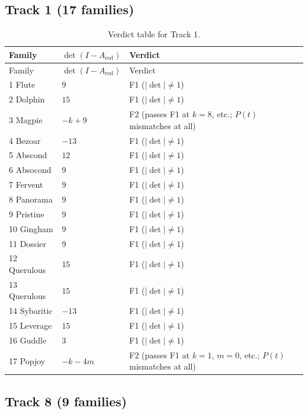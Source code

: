 \subsection{Track 1 (17 families)}

\begin{longtable}{@{}l l >{\raggedright\arraybackslash}p{}@{}}
\caption{Verdict table for Track 1.}\\
\toprule
Family & $\det(I-A_{\text{red}})$ & Verdict \\
\midrule
\endfirsthead
\toprule
Family & $\det(I-A_{\text{red}})$ & Verdict \\
\midrule
\endhead
1 Flute & $9$ & F1 ($|\det| \neq 1$) \\
2 Dolphin & $15$ & F1 ($|\det| \neq 1$) \\
3 Magpie & $-k+9$ & F2 (passes F1 at $k = 8$, etc.; $P(t)$ mismatches at all) \\
4 Bezoar & $-13$ & F1 ($|\det| \neq 1$) \\
5 Abscond & $12$ & F1 ($|\det| \neq 1$) \\
6 Absocond & $9$ & F1 ($|\det| \neq 1$) \\
7 Fervent & $9$ & F1 ($|\det| \neq 1$) \\
8 Panorama & $9$ & F1 ($|\det| \neq 1$) \\
9 Pristine & $9$ & F1 ($|\det| \neq 1$) \\
10 Gingham & $9$ & F1 ($|\det| \neq 1$) \\
11 Dossier & $9$ & F1 ($|\det| \neq 1$) \\
12 Querulous & $15$ & F1 ($|\det| \neq 1$) \\
13 Querulous & $15$ & F1 ($|\det| \neq 1$) \\
14 Sybaritic & $-13$ & F1 ($|\det| \neq 1$) \\
15 Leverage & $15$ & F1 ($|\det| \neq 1$) \\
16 Guddle & $3$ & F1 ($|\det| \neq 1$) \\
17 Popjoy & $-k-4m$ & F2 (passes F1 at $k = 1$, $m = 0$, etc.; $P(t)$ mismatches at all) \\
\bottomrule
\end{longtable}

\subsection{Track 8 (9 families)}


